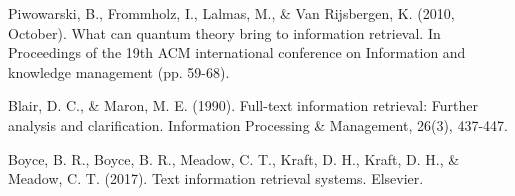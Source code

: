 \documentclass{llncs}
\begin{document}
\begin{thebibliography}{}
 Piwowarski, B., Frommholz, I., Lalmas, M., \& Van
Rijsbergen, K. (2010, October). What can quantum theory bring to information
retrieval. In Proceedings of the 19th ACM international conference on
Information and knowledge management (pp. 59-68).

 Blair, D. C., \& Maron, M. E. (1990). Full-text information
retrieval: Further analysis and clarification. Information Processing \&
Management, 26(3), 437-447.

 Boyce, B. R., Boyce, B. R., Meadow, C. T., Kraft, D. H., Kraft, D.
H., \& Meadow, C. T. (2017). Text information retrieval systems. Elsevier.

\end{thebibliography}
\clearpage
{} %
\renewcommand{\indexname}{Subject Index}

\end{document}
